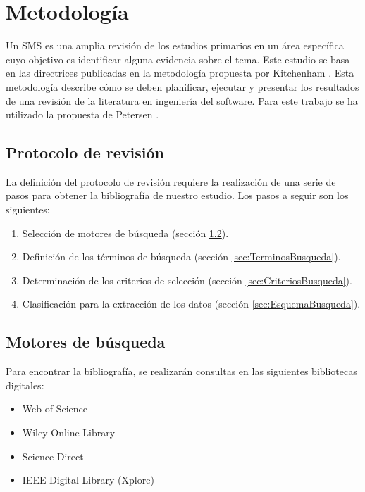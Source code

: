 \section{Metodología}

Un SMS es una amplia revisión de los estudios primarios en un área específica cuyo objetivo es identificar alguna evidencia sobre el tema. Este estudio se basa en las directrices publicadas en la metodología propuesta por Kitchenham \cite{Kitchenham:2010}. Esta metodología describe cómo se deben planificar, ejecutar y presentar los resultados de una revisión de la literatura en ingeniería del software. Para este trabajo se ha utilizado la propuesta de Petersen \cite{Petersen:2008}.

\subsection{Protocolo de revisión}

La definición del protocolo de revisión requiere la realización de una serie de pasos para obtener la bibliografía de nuestro estudio. Los pasos a seguir son los siguientes:
\begin{enumerate}
\item Selección de motores de búsqueda (sección \ref{sec:MotoresBusqueda}).
\item Definición de los términos de búsqueda (sección \ref{sec:TerminosBusqueda}).
\item Determinación de los criterios de selección (sección \ref{sec:CriteriosBusqueda}).
\item Clasificación para la extracción de los datos (sección \ref{sec:EsquemaBusqueda}).
\end{enumerate}


\subsection{Motores de búsqueda}
\label{sec:MotoresBusqueda}
Para encontrar la bibliografía, se realizarán consultas en las siguientes bibliotecas digitales: 
\begin{itemize}
\item Web of Science
\item Wiley Online Library
\item Science Direct
\item IEEE Digital Library (Xplore)
\end{itemize}

